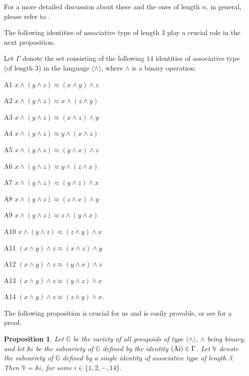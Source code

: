 \documentclass{amsart}
\theoremstyle{plain}
\newtheorem{proposition}[theorem]{Proposition}
\theoremstyle{problem}
\theoremstyle{definition}
\theoremstyle{remark}
\numberwithin{equation}{section}
\newcounter{thlistctr}
\newenvironment{thlist}{\
 \begin{list}%
 {\alph{thlistctr}}%
 {\setlength{\labelwidth}{2ex}%
 \setlength{\labelsep}{1ex}%
 \setlength{\leftmargin}{6ex}%
 \renewcommand{\makelabel}[1]{\makebox[\labelwidth][r]{\rm (##1)}}%
 \usecounter{thlistctr}}}%
 {\end{list}}
\begin{document}
For a more detailed discussion about these and the ones of length $n$, in general, please refer to \cite{CoSa18, CoSa19}.  

The following identities of associative type of length 3 play a crucial role in the next proposition.

 

Let $\Gamma$ denote the set consisting of the following $14$ identities of associative type (of length 3) in the  language $\langle \land \rangle$, where $\land $ is a binary operation:
\begin{thlist}   %
\item[A1]   $x \land (y \land  z) \approx (x \land   y) \land z$   
\item[A2]  $x \land  (y \land z) \approx x \land (z \land y)$
\item[A3]   $x \land  (y \land  z) \approx (x \land  z) \land y$ 
\item[A4]   $x \land  (y \land  z) \approx y \land  (x \land  z)$
\item[A5]   $x \land  (y \land z) \approx (y \land  x) \land z$
\item[A6]    $x \land (y \land  z) \approx y \land  (z \land  x)$
\item[A7]    $x \land  (y \land z) \approx (y \land  z) \land x$
\item[A8]   $x \land (y \land  z) \approx  (z \land  x) \land y$
\item[A9]    $x \land  (y \land  z) \approx z \land  (y \land  x)$
\item[A10]   $x \land  (y \land  z) \approx (z \land  y) \land x$
\item[A11]    $(x \land y) \land z \approx (x \land  z) \land  y$ 
\item[A12]   $(x \land  y) \land  z \approx (y \land  x) \land z$ 
\item[A13]    $(x \land  y) \land z \approx (y \land  z) \land x$ 
\item[A14]   $(x \land y) \land z \approx (z \land y) \land  x$. 
\end{thlist}



 
The following proposition is crucial for us and is easily provable, or see \cite{CoSa18} for a proof.


\begin{proposition} \label{propo_neces_identities} 
Let $\mathbb G$ be the variety of all groupoids of type $\langle \land \rangle$, $\land$ being binary, and let $\mathbb{A}i$ be the subvariety of $\mathbb G$ defined by the identity ${\rm(Ai)} \in \Gamma$.
Let $\mathbb V$ denote the subvariety of $\mathbb G$ defined by a single identity of associative type of length 3.  Then $ \mathbb V =\mathbb Ai$, for some $i \in \{1, 2, \cdots, 14\}$.  
\end{proposition} 
\end{document}
